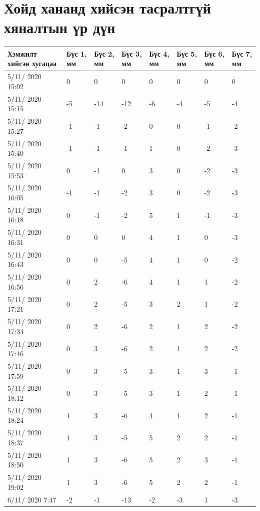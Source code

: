 \chapter{Хойд хананд хийсэн тасралтгүй хяналтын үр дүн} %

\label{AppendixB} %
\pagecolor{white}

\begin{table}[h]
    \centering
    \begin{tabular}{|p{3cm}|p{1cm}|p{1cm}|p{1cm}|p{1cm}|p{1cm}|p{1cm}|p{1cm}|}
         \hline
     Хэмжилт хийсэн хугацаа & Бүс 1, мм&	Бүс 2, мм&	Бүс 3, мм&	Бүс 4, мм&	Бүс 5, мм&	Бүс 6, мм&	Бүс 7, мм  \\ \hline
5/11/ 2020 15:02&	0&	0&	0&	0&	0&	0&	0 \\ \hline
5/11/ 2020 15:15&	-5&	-14&-12&-6&	-4&	-5&	-4 \\ \hline
5/11/ 2020 15:27&	-1&	-1&	-2&	0&	0&	-1&	-2 \\ \hline
5/11/ 2020 15:40&	-1&	-1&	-1&	1&	0&	-2&	-3 \\ \hline
5/11/ 2020 15:53&	0&	-1&	0&	3&	0&	-2&	-3 \\ \hline
5/11/ 2020 16:05&	-1&	-1&	-2&	3&	0&	-2&	-3 \\ \hline
5/11/ 2020 16:18&	0&	-1&	-2&	5&	1&	-1&	-3 \\ \hline
5/11/ 2020 16:31&	0&	0&	0&	4&	1&	0&	-3 \\ \hline
5/11/ 2020 16:43&	0&	0&	-5&	4&	1&	0&	-2 \\ \hline
5/11/ 2020 16:56&	0&	2&	-6&	4&	1&	1&	-2 \\ \hline
5/11/ 2020 17:21&	0&	2&	-5&	3&	2&	1&	-2 \\ \hline
5/11/ 2020 17:34&	0&	2&	-6&	2&	1&	2&	-2 \\ \hline
5/11/ 2020 17:46&	0&	3&	-6&	2&	1&	2&	-2 \\ \hline
5/11/ 2020 17:59&	0&	3&	-5&	3&	1&	3&	-1 \\ \hline
5/11/ 2020 18:12&	0&	3&	-5&	3&	1&	2&	-1 \\ \hline
5/11/ 2020 18:24&	1&	3&	-6&	4&	1&	2&	-1 \\ \hline
5/11/ 2020 18:37&	1&	3&	-5&	5&	2&	2&	-1 \\ \hline
5/11/ 2020 18:50&	1&	3&	-6&	5&	2&	3&	-1 \\ \hline
5/11/ 2020 19:02&	1&	3&	-6&	5&	2&	2&	-1 \\ \hline
6/11/ 2020 7:47&	-2&	-1&	-13&-2&	-3&	1&	-3 \\ \hline

\end{tabular}
\end{table}
